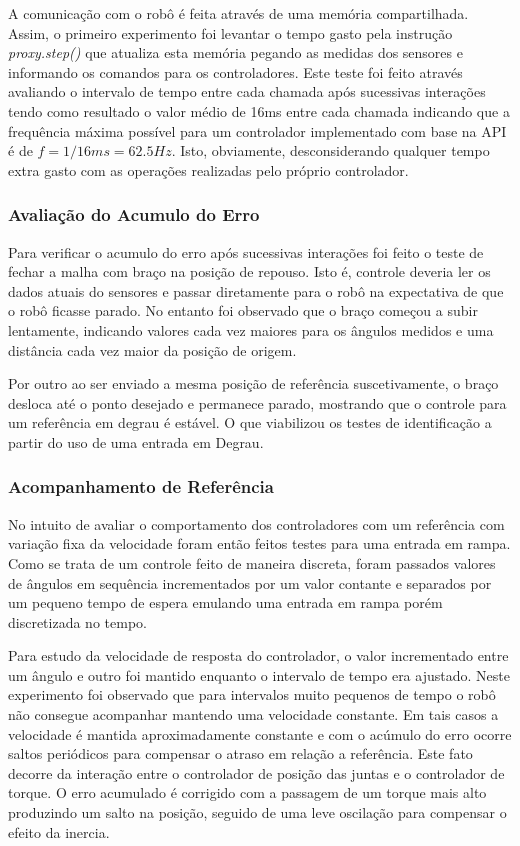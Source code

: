 A comunicação com o robô é feita através de uma memória compartilhada. Assim, o primeiro experimento foi levantar o tempo gasto pela instrução \textit{proxy.step()} que atualiza esta memória pegando as medidas dos sensores e informando os comandos para os controladores. Este teste foi feito através avaliando o intervalo de tempo entre cada chamada após sucessivas interações tendo como resultado o valor médio de 16ms entre cada chamada indicando que a frequência máxima possível para um controlador implementado com base na API é de $f = 1/16ms = 62.5Hz$. Isto, obviamente, desconsiderando qualquer tempo extra gasto com as operações realizadas pelo próprio controlador.

\subsubsection{Avaliação do Acumulo do Erro}

Para verificar o acumulo do erro após sucessivas interações foi feito o teste de fechar a malha com braço na posição de repouso. Isto é, controle deveria ler os dados atuais do sensores e passar diretamente para o robô na expectativa de que o robô ficasse parado. No entanto foi observado que o braço começou a subir lentamente, indicando valores cada vez maiores para os ângulos medidos e uma distância cada vez maior da posição de origem.

Por outro ao ser enviado a mesma posição de referência suscetivamente, o braço desloca até o ponto desejado e permanece parado, mostrando que o controle para um referência em degrau é estável. O que viabilizou os testes de identificação a partir do uso de uma entrada em Degrau.

\subsubsection{Acompanhamento de Referência}

No intuito de avaliar o comportamento dos controladores com um referência  com variação fixa da velocidade foram então feitos testes para uma entrada em rampa. Como se trata de um controle feito de maneira discreta, foram passados valores de ângulos em sequência incrementados por um valor contante e separados por um pequeno tempo de espera emulando uma entrada em rampa porém discretizada no tempo.

Para estudo da velocidade de resposta do controlador, o valor incrementado entre um ângulo e outro foi mantido enquanto o intervalo de tempo era ajustado. Neste experimento foi observado que para intervalos muito pequenos de tempo o robô não consegue acompanhar mantendo uma velocidade constante. Em tais casos a velocidade é mantida aproximadamente constante e com o acúmulo do erro ocorre saltos periódicos para compensar o atraso em relação a referência. Este fato decorre da interação entre o controlador de posição das juntas e o controlador de torque. O erro acumulado é corrigido com a passagem de um torque mais alto produzindo um salto na posição, seguido de uma leve oscilação para compensar o efeito da inercia.

